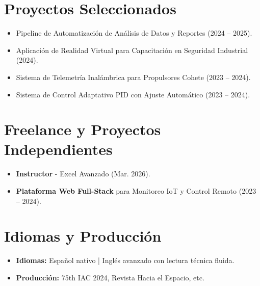 \documentclass[10pt,a4paper]{article}
\begin{document}
\section*{Proyectos Seleccionados}
\begin{itemize}[leftmargin=*, noitemsep]
    \item Pipeline de Automatización de Análisis de Datos y Reportes (2024 -- 2025).
    \item Aplicación de Realidad Virtual para Capacitación en Seguridad Industrial (2024).
    \item Sistema de Telemetría Inalámbrica para Propulsores Cohete (2023 -- 2024).
    \item Sistema de Control Adaptativo PID con Ajuste Automático (2023 -- 2024).
\end{itemize}

\section*{Freelance y Proyectos Independientes}
\begin{itemize}[leftmargin=*, noitemsep]
    \item \textbf{Instructor} - Excel Avanzado (Mar. 2026).
    \item \textbf{Plataforma Web Full-Stack} para Monitoreo IoT y Control Remoto (2023 -- 2024).
\end{itemize}

\section*{Idiomas y Producción}
\begin{itemize}[leftmargin=*, noitemsep]
    \item \textbf{Idiomas:} Español nativo | Inglés avanzado con lectura técnica fluida.
    \item \textbf{Producción:} 75th IAC 2024, Revista Hacia el Espacio, etc.
\end{itemize}
\end{document}
